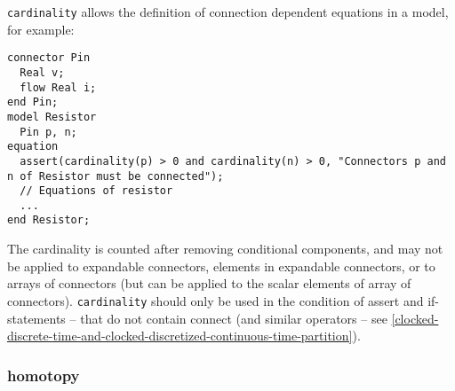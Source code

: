 \begin{nonnormative}
\lstinline!cardinality! allows the definition of connection dependent equations in a model, for example:
\begin{lstlisting}[language=modelica]
connector Pin
  Real v;
  flow Real i;
end Pin;
model Resistor
  Pin p, n;
equation
  assert(cardinality(p) > 0 and cardinality(n) > 0, "Connectors p and n of Resistor must be connected");
  // Equations of resistor
  ...
end Resistor;
\end{lstlisting}
\end{nonnormative}

The cardinality is counted after removing conditional components, and
may not be applied to expandable connectors, elements in expandable
connectors, or to arrays of connectors (but can be applied to the scalar
elements of array of connectors). \lstinline!cardinality! should only
be used in the condition of assert and if-statements -- that do not
contain connect (and similar operators -- see \autoref{clocked-discrete-time-and-clocked-discretized-continuous-time-partition}).

\subsubsection{homotopy}

